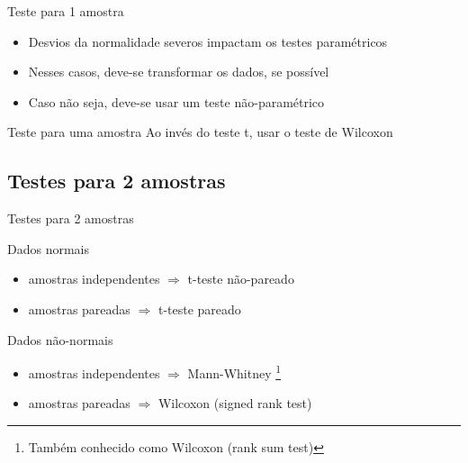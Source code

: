\documentclass{beamer}
\begin{document}
\begin{frame}{Teste para 1 amostra}
  \begin{itemize}
  \item Desvios da normalidade severos impactam os testes paramétricos
  \item Nesses casos, deve-se transformar os dados, se possível
  \item Caso não seja, deve-se usar um teste não-paramétrico
  \end{itemize}
  \begin{block}{Teste para uma amostra}
    Ao invés do teste t, usar o teste de Wilcoxon
  \end{block}
\end{frame}

\subsection[2 médias]{Testes para 2 amostras}

\begin{frame}{Testes para 2 amostras}
  \begin{block}{Dados normais}
    \begin{itemize}
    \item amostras independentes $\Rightarrow$ t-teste não-pareado
    \item amostras pareadas $\Rightarrow$ t-teste pareado
    \end{itemize}
  \end{block}
  \begin{block}{Dados não-normais}
    \begin{itemize}
    \item amostras independentes $\Rightarrow$ \alert{Mann-Whitney} \footnote{Também conhecido como Wilcoxon (rank sum test)}
    \item amostras pareadas $\Rightarrow$ Wilcoxon (signed rank test)
    \end{itemize}
  \end{block}
\end{frame}
\end{document}

